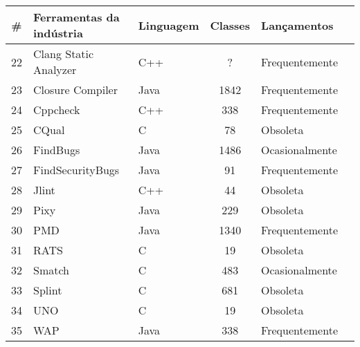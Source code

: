 \begin{table}[H]
\begin{tabular}{| c | l | l | c | l | l |}
    \hline
    \# & Ferramentas da indústria & Linguagem & Classes & Lançamentos \\
    \hline
    22 & Clang Static Analyzer    & C++   & ?     & Frequentemente \\
    23 & Closure Compiler         & Java  & 1842  & Frequentemente \\
    24 & Cppcheck                 & C++   & 338   & Frequentemente \\
    25 & CQual                    & C     & 78    & Obsoleta       \\
    26 & FindBugs                 & Java  & 1486  & Ocasionalmente \\
    27 & FindSecurityBugs         & Java  & 91    & Frequentemente \\
    28 & Jlint                    & C++   & 44    & Obsoleta       \\
    29 & Pixy                     & Java  & 229   & Obsoleta       \\
    30 & PMD                      & Java  & 1340  & Frequentemente \\
    31 & RATS                     & C     & 19    & Obsoleta       \\
    32 & Smatch                   & C     & 483   & Ocasionalmente \\
    33 & Splint                   & C     & 681   & Obsoleta       \\
    34 & UNO                      & C     & 19    & Obsoleta       \\
    35 & WAP                      & Java  & 338   & Frequentemente \\
    \hline
  \end{tabular}
  \label{total-de-ferramentas}
\end{table}
